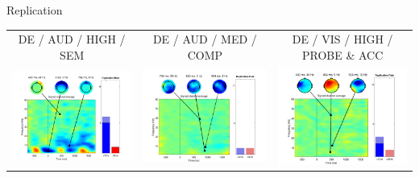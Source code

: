 \documentclass[final]{beamer}
\begin{document}
\begin{frame}{}
\begin{textblock}{67}
\begin{block}{Replication}
\begin{tabular}{c c c}
DE / AUD / HIGH / SEM & DE / AUD / MED / COMP & DE / VIS / HIGH / PROBE \& ACC \\
\includegraphics{gamma04} & \includegraphics{gamma05} & \includegraphics{gamma06} \\

\end{tabular}
\end{block}
\end{textblock}
\end{frame}
\end{document}
